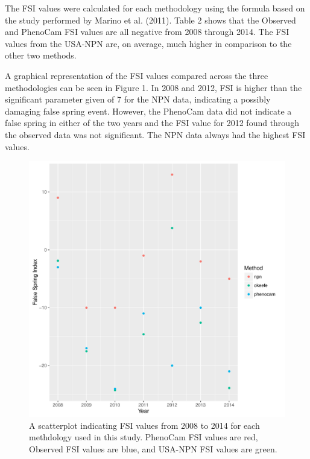 \documentclass{article}\usepackage[]{graphicx}\usepackage[]{color}
\makeatletter
\def\maxwidth{ %
  \ifdim\Gin@nat@width>\linewidth
    \linewidth
  \else
    \Gin@nat@width
  \fi
}
\makeatother
\begin{document}
The FSI values were calculated for each methodology using the formula based on the study performed by Marino et al. (2011). Table 2 shows that the Observed and PhenoCam FSI values are all negative from 2008 through 2014. The FSI values from the USA-NPN are, on average, much higher in comparison to the other two methods.  
\par
A graphical representation of the FSI values compared across the three methodologies can be seen in Figure 1. In 2008 and 2012, FSI is higher than the significant parameter given of 7 for the NPN data, indicating a possibly damaging false spring event. However, the PhenoCam data did not indicate a false spring in either of the two years and the FSI value for 2012 found through the observed data was not significant. The NPN data always had the highest FSI values.

\begin{figure}[H]
\includegraphics[width=\maxwidth]{figure/fsifig-1} \caption[A scatterplot indicating FSI values from 2008 to 2014 for each methdology used in this study]{A scatterplot indicating FSI values from 2008 to 2014 for each methdology used in this study. PhenoCam FSI values are red, Observed FSI values are blue, and USA-NPN FSI values are green.}\label{fig:fsifig}
\end{figure}
\end{document}
